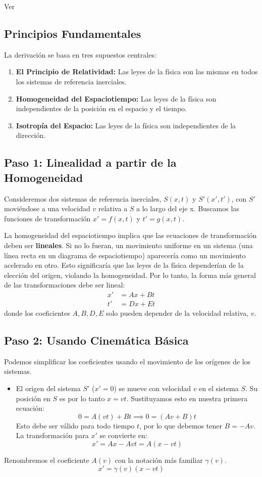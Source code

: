 \documentclass[11pt,a4paper]{article}
\begin{document}
Ver \cite{Datta:2022cpw} %


\subsection{Principios Fundamentales}
La derivación se basa en tres supuestos centrales:
\begin{enumerate}
    \item \textbf{El Principio de Relatividad:} Las leyes de la física son las mismas en todos los sistemas de referencia inerciales.
    \item \textbf{Homogeneidad del Espaciotiempo:} Las leyes de la física son independientes de la posición en el espacio y el tiempo.
    \item \textbf{Isotropía del Espacio:} Las leyes de la física son independientes de la dirección.
\end{enumerate}


\subsection{Paso 1: Linealidad a partir de la Homogeneidad}
Consideremos dos sistemas de referencia inerciales, $S(x,t)$ y $S'(x',t')$, con $S'$ moviéndose a una velocidad $v$ relativa a $S$ a lo largo del eje x. Buscamos las funciones de transformación $x' = f(x,t)$ y $t' = g(x,t)$.

La homogeneidad del espaciotiempo implica que las ecuaciones de transformación deben ser \textbf{lineales}. Si no lo fueran, un movimiento uniforme en un sistema (una línea recta en un diagrama de espaciotiempo) aparecería como un movimiento acelerado en otro. Esto significaría que las leyes de la física dependerían de la elección del origen, violando la homogeneidad. Por lo tanto, la forma más general de las transformaciones debe ser lineal:
\begin{align*}
x' &= Ax + Bt \\
t' &= Dx + Et
\end{align*}
donde los coeficientes $A, B, D, E$ solo pueden depender de la velocidad relativa, $v$.

\subsection{Paso 2: Usando Cinemática Básica}
Podemos simplificar los coeficientes usando el movimiento de los orígenes de los sistemas.
\begin{itemize}
    \item El origen del sistema $S'$ ($x'=0$) se mueve con velocidad $v$ en el sistema $S$. Su posición en $S$ es por lo tanto $x=vt$. Sustituyamos esto en nuestra primera ecuación:
    \[ 0 = A(vt) + Bt \implies 0 = (Av+B)t \]
    Esto debe ser válido para todo tiempo $t$, por lo que debemos tener $B = -Av$. La transformación para $x'$ se convierte en:
    \[ x' = Ax - Avt = A(x-vt) \]
\end{itemize}
Renombremos el coeficiente $A(v)$ con la notación más familiar $\gamma(v)$.
\begin{equation} \label{eq:x_prime}
x' = \gamma(v)(x - vt)
\end{equation}
\end{document}
